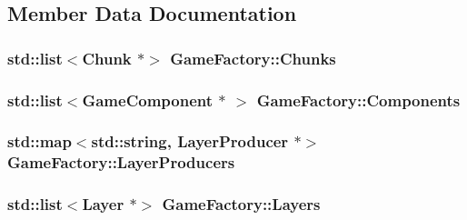 \subsection{Member Data Documentation}
\hypertarget{class_game_factory_a77496a7ea1e2fa54acb18c499b3bd3bb}{
\subsubsection[{Chunks}]{\setlength{\rightskip}{0pt plus 5cm}std\-::list$<${\bf Chunk} $\ast$$>$ Game\-Factory\-::\-Chunks\hspace{0.3cm}{\ttfamily [private]}}}\label{class_game_factory_a77496a7ea1e2fa54acb18c499b3bd3bb}
\hypertarget{class_game_factory_a90fc6360610babaf3d2d880f782772b3}{
\subsubsection[{Components}]{\setlength{\rightskip}{0pt plus 5cm}std\-::list$<${\bf Game\-Component} $\ast$ $>$ Game\-Factory\-::\-Components\hspace{0.3cm}{\ttfamily [private]}}}\label{class_game_factory_a90fc6360610babaf3d2d880f782772b3}
\hypertarget{class_game_factory_adfadca1996a3982f4b45c67ced1520f2}{
\subsubsection[{Layer\-Producers}]{\setlength{\rightskip}{0pt plus 5cm}std\-::map$<$std\-::string, {\bf Layer\-Producer} $\ast$$>$ Game\-Factory\-::\-Layer\-Producers\hspace{0.3cm}{\ttfamily [private]}}}\label{class_game_factory_adfadca1996a3982f4b45c67ced1520f2}
\hypertarget{class_game_factory_a7ab6a968cb7af49813407fe66927c126}{
\subsubsection[{Layers}]{\setlength{\rightskip}{0pt plus 5cm}std\-::list$<${\bf Layer} $\ast$$>$ Game\-Factory\-::\-Layers\hspace{0.3cm}{\ttfamily [private]}}}\label{class_game_factory_a7ab6a968cb7af49813407fe66927c126}
